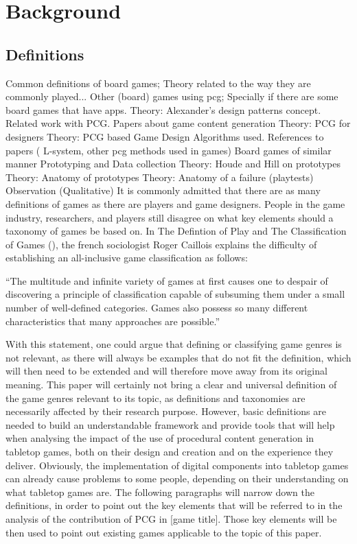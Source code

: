 \section{Background}
\subsection{Definitions}
Common definitions of board games; Theory related to the way they are commonly played...
Other (board) games using pcg; Specially if there are some board games that have apps. 
Theory: Alexander's design patterns concept.
Related work with PCG.
Papers about game content generation
Theory: PCG for designers
Theory: PCG based Game Design
Algorithms used.
References to papers ( L-system, other pcg methods used in games)
Board games of similar manner
Prototyping and Data collection 
Theory: Houde and Hill on prototypes
Theory: Anatomy of prototypes
Theory: Anatomy of a failure (playtests)
Observation (Qualitative)
It is commonly admitted that there are as many definitions of games as there are players and game designers. People in the game industry, researchers, and players still disagree on what key elements should a taxonomy of games be based on. In The Defintion of Play and The Classification of Games (), the french sociologist Roger Caillois explains the difficulty of establishing an all-inclusive game classification as follows:

“The multitude and infinite variety of games at first causes one to despair of discovering a principle of classification capable of subsuming them under a small number of well-defined categories. Games also possess so many different characteristics that many approaches are possible.”

With this statement, one could argue that defining or classifying game genres is not relevant, as there will always be examples that do not fit the definition, which will then need to be extended and will therefore move away from its original meaning. This paper will certainly not bring a clear and universal definition of the game genres relevant to its topic, as definitions and taxonomies are necessarily affected by their research purpose. However, basic definitions are needed to build an understandable framework and provide tools that will help when analysing the impact of the use of procedural content generation in tabletop games, both on their design and creation and on the experience they deliver.
Obviously, the implementation of digital components into tabletop games can already cause problems to some people, depending on their understanding on what tabletop games are. The following paragraphs will narrow down the definitions, in order to point out the key elements that will be referred to in the analysis of the contribution of PCG in [game title]. Those key elements will be then used to point out existing games applicable to the topic of this paper.

